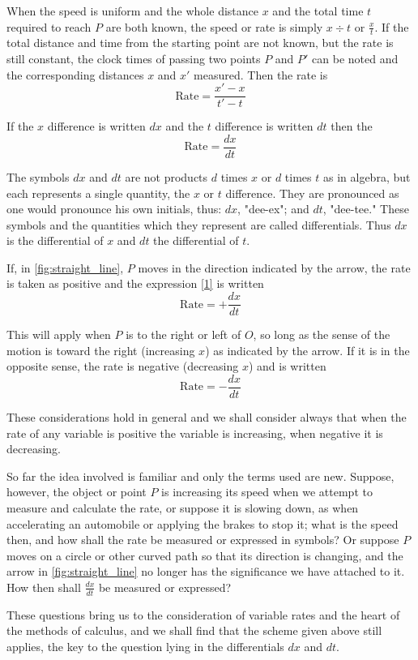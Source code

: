When the speed is uniform and the whole distance $x$ and the total time $t$ required to reach $P$ are both known, the speed or rate is simply $x \div t$ or $\frac{x}{t}$. If the total distance and time from the starting point are not known, but the rate is still constant, the clock times of passing two points $P$ and $P'$ can be noted and the corresponding distances $x$ and $x'$ measured. Then the rate is
\[\text{Rate} = \frac{x' - x}{t' - t}\]

If the $x$ difference is written $dx$ and the $t$ difference is written $dt$ then the
\[\text{Rate} = \frac{dx}{dt} \tag{1} \label{1}\]

The symbols $dx$ and $dt$ are not products $d$ times $x$ or $d$ times $t$ as in algebra, but each represents a single quantity, the $x$ or $t$ difference. They are pronounced as one would pronounce his own initials, thus: $dx$, "dee-ex"; and $dt$, "dee-tee." These symbols and the quantities which they represent are called differentials. Thus $dx$ is the differential of $x$ and $dt$ the differential of $t$.

If, in \autoref{fig:straight_line}, $P$ moves in the direction indicated by the arrow, the rate is taken as positive and the expression \eqref{1} is written
\[\text{Rate} = +\frac{dx}{dt}\]

This will apply when $P$ is to the right or left of $O$, so long as the sense of the motion is toward the right (increasing $x$) as indicated by the arrow. If it is in the opposite sense, the rate is negative (decreasing $x$) and is written
\[\text{Rate} = -\frac{dx}{dt}\]

These considerations hold in general and we shall consider always that when the rate of any variable is positive the variable is increasing, when negative it is decreasing.

So far the idea involved is familiar and only the terms used are new. Suppose, however, the object or point $P$ is increasing its speed when we attempt to measure and calculate the rate, or suppose it is slowing down, as when accelerating an automobile or applying the brakes to stop it; what is the speed then, and how shall the rate be measured or expressed in symbols? Or suppose $P$ moves on a circle or other curved path so that its direction is changing, and the arrow in \autoref{fig:straight_line} no longer has the significance we have attached to it. How then shall $\frac{dx}{dt}$ be measured or expressed?

These questions bring us to the consideration of variable rates and the heart of the methods of calculus, and we shall find that the scheme given above still applies, the key to the question lying in the differentials $dx$ and $dt$.

